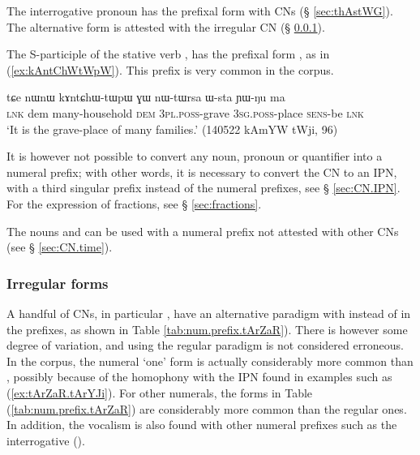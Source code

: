 The interrogative pronoun  has the prefixal form  with CNs (§  \ref{sec:thAstWG}). The alternative form  is attested with the irregular  CN  (§ \ref{sec:irregular.numeral.prefixes}).

The S-participle   of the stative verb ,  has the prefixal form , as in (\ref{ex:kAntChWtWpW}). This prefix is very common in the corpus.

\begin{exe}
\ex \label{ex:kAntChWtWpW}
\gll  tɕe nɯnɯ kɤntɕhɯ-tɯpɯ ɣɯ nɯ-tɯrsa ɯ-sta ɲɯ-ŋu ma \\
 \textsc{lnk} dem many-household \textsc{dem} \textsc{3pl}.\textsc{poss}-grave \textsc{3sg}.\textsc{poss}-place \textsc{sens}-be \textsc{lnk} \\
\glt `It is the grave-place of many families.' (140522 kAmYW tWji, 96)
\end{exe}

It is however not possible to convert any noun, pronoun or quantifier into a numeral prefix; with other words, it is necessary to convert the CN to an IPN, with a third singular  prefix instead of the numeral prefixes, see § \ref{sec:CN.IPN}. For the expression of fractions, see § \ref{sec:fractions}.

The nouns  and  can be used with a numeral prefix  not attested with other CNs (see § \ref{sec:CN.time}).

\subsubsection{Irregular forms} \label{sec:irregular.numeral.prefixes}
A handful of CNs, in particular , have an alternative paradigm with  instead of  in the prefixes, as shown in Table \ref{tab:num.prefix.tArZaR}). There is however some degree of variation, and using the regular paradigm is not considered erroneous. In the corpus, the numeral `one' form  is actually considerably more common than , possibly because of the homophony with the IPN  found in examples such as (\ref{ex:tArZaR.tArYJi}). For other numerals, the forms in Table (\ref{tab:num.prefix.tArZaR}) are considerably more common than the regular ones. In addition, the  vocalism is also found with other numeral prefixes such as the interrogative ().

